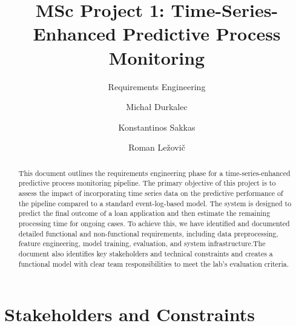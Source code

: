 \documentclass[runningheads]{llncs}
\begin{document}
%
\title{MSc Project 1: Time-Series-Enhanced Predictive Process Monitoring}
\subtitle{Requirements Engineering}
%
%
\author{Michał Durkalec \and
    Konstantinos Sakkas \and
    Roman Ležovič
}
%
%
%
\maketitle  %
%
\begin{abstract}
    This document outlines the requirements engineering phase for a time-series-enhanced predictive process monitoring pipeline. The primary objective of this project is to assess the impact of incorporating time series data on the predictive performance of the pipeline compared to a standard event-log-based model. The system is designed to predict the final outcome of a loan application and then estimate the remaining processing time for ongoing cases. To achieve this, we have identified and documented detailed functional and non-functional requirements, including data preprocessing, feature engineering, model training, evaluation, and system infrastructure.The document also identifies key stakeholders and technical constraints and creates a functional model with clear team responsibilities to meet the lab's evaluation criteria.

\end{abstract}
%
%
%
\section{Stakeholders and Constraints}
\end{document}
